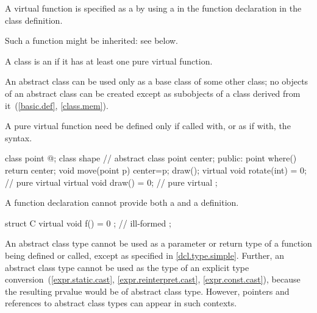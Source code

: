 \pnum
A virtual function is specified as
a  by using a
 in the function declaration
in the class definition.
\begin{note}
Such a function might be inherited: see below.
\end{note}
A class is an 
if it has at least one pure virtual function.
\begin{note}
An abstract class can be used only as a base class of some other class;
no objects of an abstract class can be created
except as subobjects of a class
derived from it~(\ref{basic.def}, \ref{class.mem}).
\end{note}
%
A pure virtual function need be defined only if called with, or as if
with, the 
syntax.
\begin{example}
\begin{codeblock}
class point { @\commentellip@ };
class shape {                   // abstract class
  point center;
public:
  point where() { return center; }
  void move(point p) { center=p; draw(); }
  virtual void rotate(int) = 0; // pure virtual
  virtual void draw() = 0;      // pure virtual
};
\end{codeblock}
\end{example}
\begin{note}
A function declaration cannot provide both a 
and a definition.
\end{note}
\begin{example}
\begin{codeblock}
struct C {
  virtual void f() = 0 { };     // ill-formed
};
\end{codeblock}
\end{example}

\pnum
\begin{note}
An abstract class type cannot be used
as a parameter or return type of
a function being defined or called,
except as specified in \ref{dcl.type.simple}.
Further, an abstract class type cannot be used as
the type of an explicit type conversion~(\ref{expr.static.cast},
\ref{expr.reinterpret.cast}, \ref{expr.const.cast}),
because the resulting prvalue would be of abstract class type.
However, pointers and references to abstract class types
can appear in such contexts.
\end{note}

